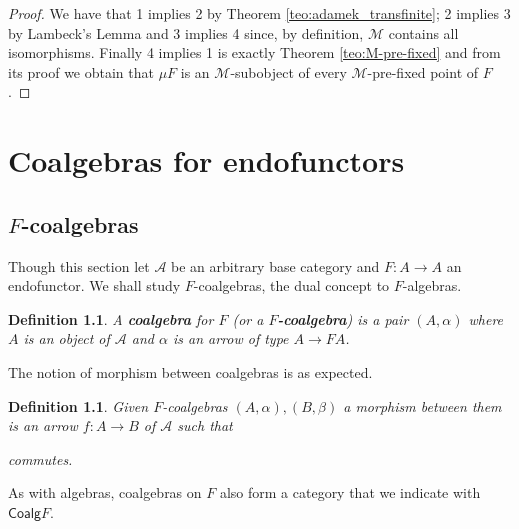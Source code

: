 \documentclass[letterpaper, 11pt, oneside]{memoir}
\theoremstyle{myteo}
\newtheorem{definition}[theorem]{Definition}
\numberwithin{equation}{section}
\newcommand{\marginnote}[1]{\marginpar{\footnotesize #1}}
\newcommand{\Coalg}{\textsf{Coalg}}
\newcommand{\A}{\mathscr{A}}
\begin{document}
\begin{proof}
  We have that 1 implies 2 by Theorem \ref{teo:adamek_transfinite}; 2 implies 3 by Lambeck's Lemma and 3 implies 4 since, by definition, \(\mathcal{M}\) contains all isomorphisms.
  Finally 4 implies 1 is exactly Theorem \ref{teo:M-pre-fixed} and from its proof we obtain that \(\mu F\) is an \(\mathcal{M}\)-subobject of every \(\mathcal{M}\)-pre-fixed point of \(F\).
\end{proof}

\chapter{Coalgebras for endofunctors}
\newpage

\section{\(F\)-coalgebras}

Though this section let \(\A\) be an arbitrary base category and \(F : A → A\) an endofunctor.
We shall study \(F\)-coalgebras, the dual concept to \(F\)-algebras.

\begin{definition}
  A \textbf{coalgebra} for \(F\) (or a \(F\)\textbf{-coalgebra})\marginnote{\(F\)-coalgebra} is a pair \((A, \alpha)\) where \(A\) is an object of \(\A\) and \(\alpha\) is an arrow of type \(A \to FA\).
\end{definition}

The notion of morphism between coalgebras is as expected.

\begin{definition}
  \label{def:coalgebra-morphism}
  Given \(F\)-coalgebras \((A, \alpha), (B, \beta)\) a morphism between them is an arrow \(f : A \to B\) of \(\A\) such that
  \begin{center}
  \end{center}
  commutes.
\end{definition}

As with algebras, coalgebras on \(F\) also form a category that we indicate with \(\Coalg F\)\marginnote{\(\Coalg F\)}.
\end{document}

